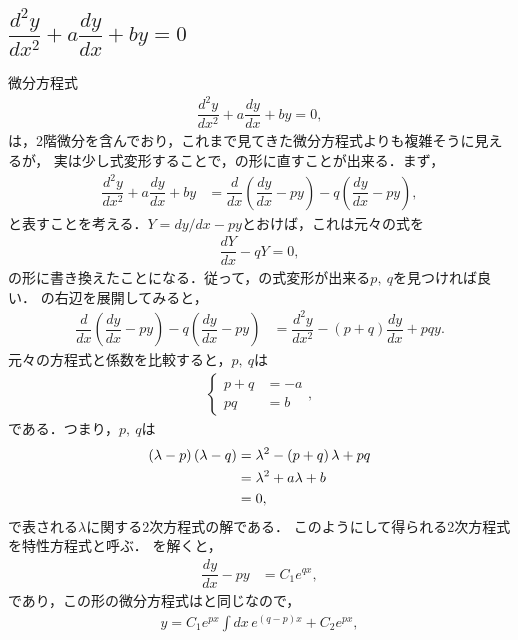 \subsection{$\dfrac{d^2y}{dx^2} + a \dfrac{dy}{dx} + by = 0$\label{sec:PDE_04}}
%
微分方程式
\begin{align}
  \dfrac{d^2y}{dx^2} + a \dfrac{dy}{dx} + by = 0, \label{eq:PDE_04}
\end{align}
は，2階微分を含んでおり，これまで見てきた微分方程式よりも複雑そうに見えるが，
実は少し式変形することで，の形に直すことが出来る．まず，
\begin{align}
  \dfrac{d^{2}y}{dx^{2}}+a\dfrac{dy}{dx}+by & =\dfrac{d}{dx}\left(\dfrac{dy}{dx}-py\right)-q\left(\dfrac{dy}{dx}-py\right),
  \label{eq:PDE_04_rewrite}
\end{align}
と表すことを考える．$Y = dy/dx - py$とおけば，これは元々の式を
\begin{align}
  \dfrac{dY}{dx} - qY = 0, \label{eq:PDE_04_convert} 
\end{align}
の形に書き換えたことになる．従って，の式変形が出来る$p,~q$を見つければ良い．
の右辺を展開してみると，
\begin{align}
  \dfrac{d}{dx}\left(\dfrac{dy}{dx}-py\right)-q\left(\dfrac{dy}{dx}-py\right) & =\dfrac{d^{2}y}{dx^{2}}-\left(p+q\right)\dfrac{dy}{dx}+pqy. 
\end{align}
元々の方程式と係数を比較すると，$p,~q$は
\begin{align}
  \begin{cases}
    p + q &= -a \\
    pq    &= b 
  \end{cases},
\end{align}
である．つまり，$p,~q$は
\begin{align}
  \left(\lambda-p\right)\left(\lambda-q\right) & =\lambda^{2}-\left(p+q\right)\lambda+pq\notag\\
   & =\lambda^{2}+a\lambda+b\notag\\
   & =0,
\end{align}
で表される$\lambda$に関する2次方程式の解である．
このようにして得られる2次方程式を特性方程式と呼ぶ．
を解くと，
\begin{align}
  \dfrac{dy}{dx} - py & = C_{1}e^{qx},
\end{align}
であり，この形の微分方程式はと同じなので，
\begin{align}
y = C_{1}e^{px}\int dx\, e^{\left(q-p\right)x} + C_{2}e^{px}, \label{eq:PDE_04_sol_general} 
\end{align}
